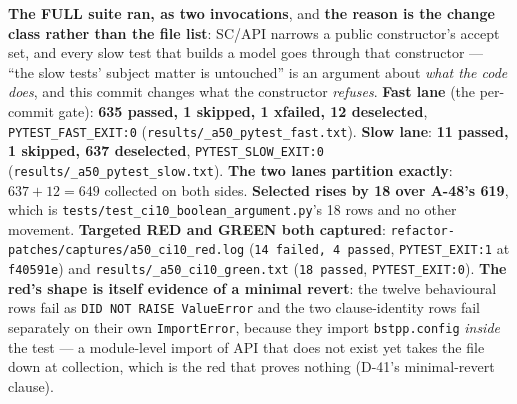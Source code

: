 \documentclass[
  10pt,
]{article}
\begin{document}
\textbf{The FULL suite ran, as two invocations}, and \textbf{the reason is the change class rather than the file list}: SC/API narrows a public constructor's accept set, and every slow test that builds a model goes through that constructor --- ``the slow tests' subject matter is untouched'' is an argument about \emph{what the code does}, and this commit changes what the constructor \emph{refuses}. \textbf{Fast lane} (the per-commit gate): \textbf{635 passed, 1 skipped, 1 xfailed, 12 deselected}, \texttt{PYTEST\_FAST\_EXIT:0} (\texttt{results/\allowbreak{}\_a50\_pytest\_fast.txt}). \textbf{Slow lane}: \textbf{11 passed, 1 skipped, 637 deselected}, \texttt{PYTEST\_SLOW\_EXIT:0} (\texttt{results/\allowbreak{}\_a50\_pytest\_slow.txt}). \textbf{The two lanes partition exactly}: $637 + 12 = 649$ collected on both sides. \textbf{Selected rises by 18 over A-48's 619}, which is \texttt{tests/\allowbreak{}test\_ci10\_boolean\_argument.py}'s 18 rows and no other movement. \textbf{Targeted RED and GREEN both captured}: \texttt{refactor-patches/\allowbreak{}captures/\allowbreak{}a50\_ci10\_red.log} (\texttt{14 failed, 4 passed}, \texttt{PYTEST\_EXIT:1} at \texttt{f40591e}) and \texttt{results/\allowbreak{}\_a50\_ci10\_green.txt} (\texttt{18 passed}, \texttt{PYTEST\_EXIT:0}). \textbf{The red's shape is itself evidence of a minimal revert}: the twelve behavioural rows fail as \texttt{DID NOT RAISE ValueError} and the two clause-identity rows fail separately on their own \texttt{ImportError}, because they import \texttt{bstpp.config} \emph{inside} the test --- a module-level import of API that does not exist yet takes the file down at collection, which is the red that proves nothing (D-41's minimal-revert clause).
\end{document}
